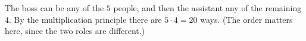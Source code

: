 The boss can be any of the $5$ people, and then the assistant any of the remaining $4$. By the multiplication principle there are $5\cdot4=\boxed{20}$ ways. (The order matters here, since the two roles are different.)
